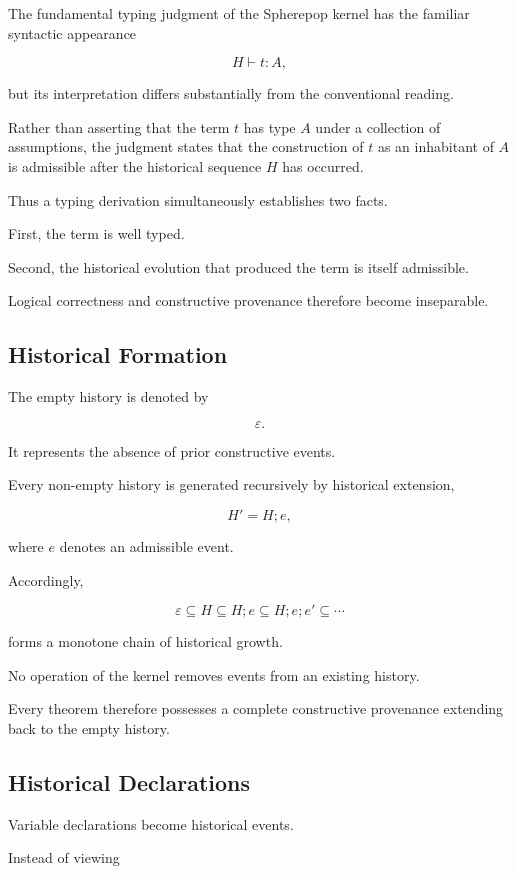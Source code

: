 \documentclass[12pt,oneside]{article}
\theoremstyle{definition}
\theoremstyle{remark}
\begin{document}
The fundamental typing judgment of the Spherepop kernel has the familiar
syntactic appearance

\[
H \vdash t : A,
\]

but its interpretation differs substantially from the conventional reading.

Rather than asserting that the term \(t\) has type \(A\) under a collection of
assumptions, the judgment states that the construction of \(t\) as an inhabitant
of \(A\) is admissible after the historical sequence \(H\) has occurred.

Thus a typing derivation simultaneously establishes two facts.

First, the term is well typed.

Second, the historical evolution that produced the term is itself admissible.

Logical correctness and constructive provenance therefore become inseparable.

\subsection{Historical Formation}

The empty history is denoted by

\[
\varepsilon.
\]

It represents the absence of prior constructive events.

Every non-empty history is generated recursively by historical extension,

\[
H' = H ; e,
\]

where \(e\) denotes an admissible event.

Accordingly,

\[
\varepsilon
\subseteq
H
\subseteq
H;e
\subseteq
H;e;e'
\subseteq
\cdots
\]

forms a monotone chain of historical growth.

No operation of the kernel removes events from an existing history.

Every theorem therefore possesses a complete constructive provenance extending
back to the empty history.

\subsection{Historical Declarations}

Variable declarations become historical events.

Instead of viewing
\end{document}
